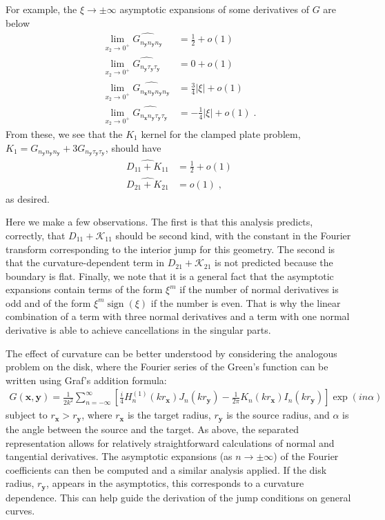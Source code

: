 \documentclass[preprint,12pt,3p]{elsarticle}
\newcommand{\bx}{{\mathbf{x}}}
\newcommand{\by}{{\mathbf{y}}}
\DeclareMathOperator{\sign}{sign}
\begin{document}
For example, the $\xi \to \pm \infty$ asymptotic expansions of some derivatives of
$G$ are below 
\begin{align}
    \lim_{x_2\to 0^+} \widehat{G_{n_\by n_\by n_\by}} &= \frac{1}{2} + o(1)\\
    \lim_{x_2\to 0^+} \widehat{G_{n_\by \tau_\by \tau_\by}} &= 0 + o(1)\\
    \lim_{x_2\to 0^+} \widehat{G_{n_\bx n_\by n_\by n_\by}} &= \frac{3}{4} |\xi| + o(1) \\
    \lim_{x_2\to 0^+} \widehat{G_{n_\bx n_\by \tau_\by \tau_\by}} &= -\frac{1}{4} |\xi| + o(1) \; .     
\end{align}
From these, we see that the $K_1$ kernel for the clamped plate problem, 
$K_1 = G_{n_\by n_\by n_\by} + 3 G_{n_\by \tau_\by \tau_\by}$, should have 
\begin{align}
    \widehat{D_{11} + K_{11}} &= \frac{1}{2} + o(1) \\
    \widehat{D_{21} + K_{21}} &= o(1) \; ,
\end{align}
as desired. 

Here we make a few observations. The first is that this analysis predicts,
correctly, that $D_{11} + \mathcal{K}_{11}$ should be second kind, with the constant in the
Fourier transform corresponding to the interior jump for this geometry. The second
is that the curvature-dependent term in $D_{21} + \mathcal{K}_{21}$ is not predicted because the
boundary is flat. Finally, we note that it is a general fact that the asymptotic
expansions contain terms of the form $\xi^m$ if the number of normal derivatives is
odd and of the form $\xi^m\sign (\xi)$ if the number is even. That is why the linear
combination of a term with three normal derivatives and a term with one normal
derivative is able to achieve cancellations in the singular parts. 

The effect of curvature can be better understood by considering the analogous
problem on the disk, where the Fourier series of the Green's function can be written using Graf's addition formula: 
\begin{align}
    G(\mathbf{x}, \mathbf{y}) = \frac{1}{2k^2} \sum_{n=-\infty}^\infty \left[ \frac{i}{4} H_n^{(1)}(kr_\mathbf{x})J_n(kr_\mathbf{y}) - \frac{1}{2\pi} K_n(kr_\mathbf{x}) I_n(kr_\mathbf{y}) \right] \exp{(in\alpha)} \label{grafs} 
\end{align}
subject to $r_\mathbf{x} > r_\mathbf{y}$, where $r_\mathbf{x}$ is the target radius, $r_\mathbf{y}$ is the source radius, and $\alpha$ is the angle between the source and the target. As above, the separated representation allows for relatively
straightforward calculations of normal and tangential derivatives. The asymptotic expansions 
(as $n \to \pm \infty$) of the Fourier coefficients can then be computed and a similar analysis 
applied. If the disk radius, $r_\by$, appears in the asymptotics, this corresponds to a curvature
dependence. This can help guide the derivation of the jump conditions on general curves.
\end{document}
